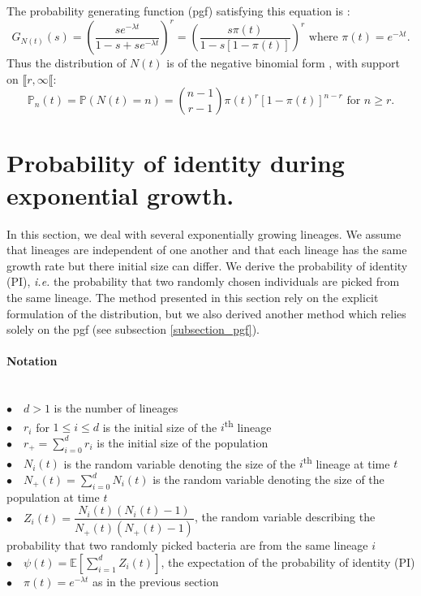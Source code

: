 \documentclass{article}
\newcommand{\pr}{{\mathbb{P}}}
\begin{document}
The probability generating function (pgf) satisfying this equation is \cite[p. 158]{cox1977theory} :
\begin{equation}
G_{N(t)}(s)=\left( \dfrac{s e^{-\lambda t}}{1-s+s e^{-\lambda t}} \right)^r=\left( \dfrac{s\pi(t)}{1-s[1-\pi(t)]} \right)^r \text{ where }\pi(t)=e^{-\lambda t}.
\end{equation}
Thus the distribution of $N(t)$ is of the negative binomial form \cite[p. 158]{cox1977theory}, with support on $\llbracket r ,\infty \llbracket$: 
\begin{equation}
\pr_n(t)=\pr(N(t)=n)=\binom{n-1}{r-1} \pi(t)^r [1-\pi(t)]^{n-r} \text{ for } n \geq r.
\end{equation}
\section{Probability of identity during exponential growth.}
\label{section_PI}
 In this section, we deal with several exponentially growing lineages. We assume that lineages are independent of one another and that each lineage has the same growth rate but there initial size can differ. We derive the probability of identity (PI), \textit{i.e.} the probability that two randomly chosen individuals are picked from the same lineage. The method presented in this section rely on the explicit formulation of the distribution, but we also derived another method which relies solely on the pgf (see subsection \ref{subsection_pgf}).
 \\
  \paragraph{Notation} $ $\\
 $\bullet \quad d>1$ is the number of lineages\\
 $\bullet \quad r_i $ for $1 \leq i \leq d$ is the initial size of the $i$\textsuperscript{th} lineage\\
 $\displaystyle \bullet \quad r_+=\sum_{i=0}^d r_i$ is the initial size of the population \\
 $\bullet \quad N_i(t) $ is the random variable denoting the size of the $i$\textsuperscript{th} lineage at time $t$ \\
 $\displaystyle \bullet \quad N_+(t)=\sum_{i=0}^d N_i(t)$ is the random variable denoting the size of the population at time $t$ \\
 $\bullet \quad Z_i(t)=\dfrac{N_i(t)(N_i(t)-1)}{N_+(t)( N_+(t)-1 ) }$, the random variable describing the probability that two randomly picked bacteria are from the same lineage $i$\\
 $\bullet \quad \psi(t)=\mathbb{E}[\sum_{i=1}^d Z_i(t)]$, the expectation of the probability of identity (PI)\\
 $\bullet \quad \pi(t)=e^{-\lambda t} $ as in the previous section\\
 
\end{document}
